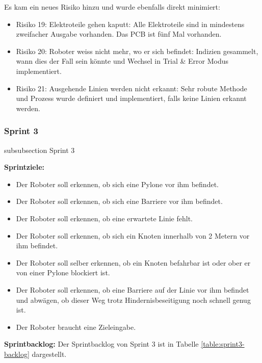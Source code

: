 Es kam ein neues Risiko hinzu und wurde ebenfalls direkt minimiert:
\begin{itemize}
    \item Risiko 19: Elektroteile gehen kaputt: Alle Elektroteile sind in mindestens zweifacher Ausgabe vorhanden. Das PCB ist fünf Mal vorhanden.
    \item Risiko 20: Roboter weiss nicht mehr, wo er sich befindet: Indizien gesammelt, wann dies der Fall sein könnte und Wechsel in Trial \& Error Modus implementiert.
    \item Risiko 21: Ausgehende Linien werden nicht erkannt: Sehr robute Methode und Prozess wurde definiert und implementiert, falls keine Linien erkannt werden.
\end{itemize}
\newpage

\subsubsection*{Sprint 3}
    {subsubsection}
    {Sprint 3}

\textbf{Sprintziele:}
\begin{itemize}
    \item Der Roboter soll erkennen, ob sich eine Pylone vor ihm befindet.
    \item Der Roboter soll erkennen, ob sich eine Barriere vor ihm befindet.
    \item Der Roboter soll erkennen, ob eine erwartete Linie fehlt.
    \item Der Roboter soll erkennen, ob sich ein Knoten innerhalb von 2 Metern vor ihm befindet.
    \item Der Roboter soll selber erkennen, ob ein Knoten befahrbar ist oder ober er von einer Pylone blockiert ist.
    \item Der Roboter soll erkennen, ob eine Barriere auf der Linie vor ihm befindet und abwägen, ob dieser Weg trotz Hindernisbeseitigung noch schnell genug ist.
    \item Der Roboter braucht eine Zieleingabe.

\end{itemize}

\textbf{Sprintbacklog:} Der Sprintbacklog von Sprint 3 ist in Tabelle 
\ref{table:sprint3-backlog} 
dargestellt.


